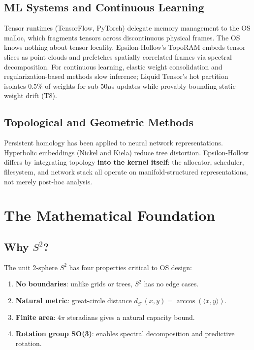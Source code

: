 \documentclass[11pt, a4paper]{article}
\theoremstyle{proofform}
\numberwithin{innerpoints}{subsection}
\numberwithin{disproof}{subsection}
\theoremstyle{mathproof}
\begin{document}
\subsection{ML Systems and Continuous Learning}

Tensor runtimes (TensorFlow, PyTorch) delegate memory management to the OS malloc, which fragments tensors across discontinuous physical frames. The OS knows nothing about tensor locality. Epsilon-Hollow's TopoRAM embeds tensor slices as point clouds and prefetches spatially correlated frames via spectral decomposition. For continuous learning, elastic weight consolidation and regularization-based methods slow inference; Liquid Tensor's hot partition isolates 0.5\% of weights for sub-50$\mu$s updates while provably bounding static weight drift (T8).

\subsection{Topological and Geometric Methods}

Persistent homology has been applied to neural network representations. Hyperbolic embeddings (Nickel and Kiela) reduce tree distortion. Epsilon-Hollow differs by integrating topology \textbf{into the kernel itself}: the allocator, scheduler, filesystem, and network stack all operate on manifold-structured representations, not merely post-hoc analysis.

\section{The Mathematical Foundation}
\label{sec:math}

\subsection{Why $S^2$?}

The unit 2-sphere $S^2$ has four properties critical to OS design:
\begin{enumerate}[nosep]
  \item \textbf{No boundaries}: unlike grids or trees, $S^2$ has no edge cases.
  \item \textbf{Natural metric}: great-circle distance $d_{S^2}(x,y) = \arccos(\langle x, y \rangle)$.
  \item \textbf{Finite area}: $4\pi$ steradians gives a natural capacity bound.
  \item \textbf{Rotation group SO(3)}: enables spectral decomposition and predictive rotation.
\end{enumerate}
\end{document}
